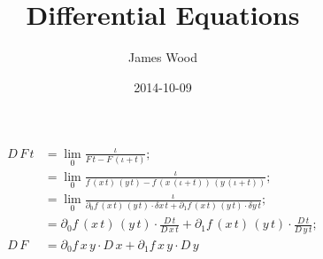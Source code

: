 \message{ !name(de.tex)}\documentclass[11pt]{article}
\title{\textbf{Differential Equations}}
\author{James Wood}
\date{2014-10-09}
\newcommand*\id{\iota}
\newcommand*\cd{\cdot}
\begin{document}
\[
\begin{aligned}
D\,F\,t&=\lim_0\frac{\id}{F\,t-F\,(\id+t)};\\
&=\lim_0\frac{\id}{f\,(x\,t)\,(y\,t)-f\,(x\,(\id+t))\,(y\,(\id+t))};\\
&=\lim_0\frac{\id}{\partial_0f\,(x\,t)\,(y\,t)\cd\delta x\,t+\partial_1f\,(x\,t)\,(y\,t)\cd\delta y\,t};\\
&=\partial_0f\,(x\,t)\,(y\,t)\cd\frac{D\,t}{D\,x\,t}+\partial_1f\,(x\,t)\,(y\,t)\cd\frac{D\,t}{D\,y\,t};\\
D\,F&=\partial_0f\,x\,y\cd D\,x+\partial_1f\,x\,y\cd D\,y
\end{aligned}
\]
\end{document}
